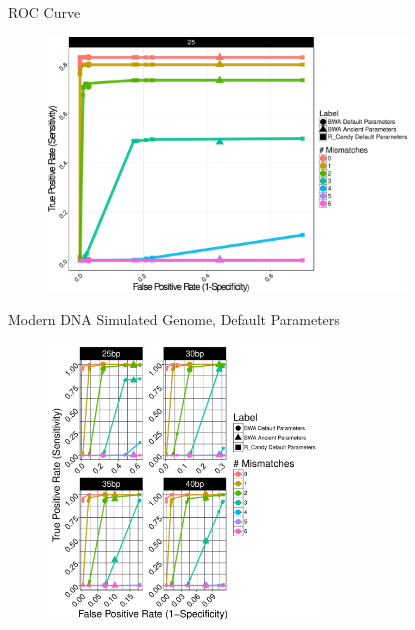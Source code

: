 \documentclass{beamer}
\begin{document}
\begin{frame}{ROC Curve}

	\begin{figure}[H]
		\centering
		\includegraphics[width=9.5cm]{pics/DS6-25-hh1.png}
		
	\end{figure}

\end{frame}

\begin{frame}{\small{Modern DNA Simulated Genome, Default Parameters}}
	
	\begin{figure}[H]
\centering
\includegraphics[width=7.35cm]{pics/f_DS3_emp.pdf}
\end{figure}
\end{frame}
\end{document}
